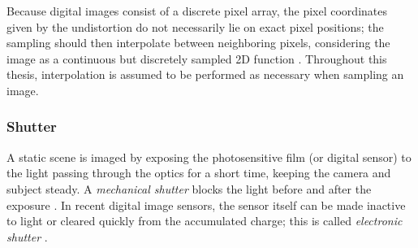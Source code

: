 Because digital images consist of a discrete pixel array, the pixel coordinates given by the undistortion do not necessarily lie on exact pixel positions; the sampling should then interpolate between neighboring pixels, considering the image as a continuous but discretely sampled 2D function \cite{wolberg1990digital}.
Throughout this thesis, interpolation is assumed to be performed as necessary when sampling an image.




\subsubsection{Shutter} %


A static scene is imaged by exposing the photosensitive film (or digital sensor) to the light passing through the optics for a short time, keeping the camera and subject steady.
A \emph{mechanical shutter} blocks the light before and after the exposure \cite{greenleaf1950photographic}.
In recent digital image sensors, the sensor itself can be made inactive to light or cleared quickly from the accumulated charge; this is called \emph{electronic shutter} \cite{caspeelectronic,kodakshutter}.





